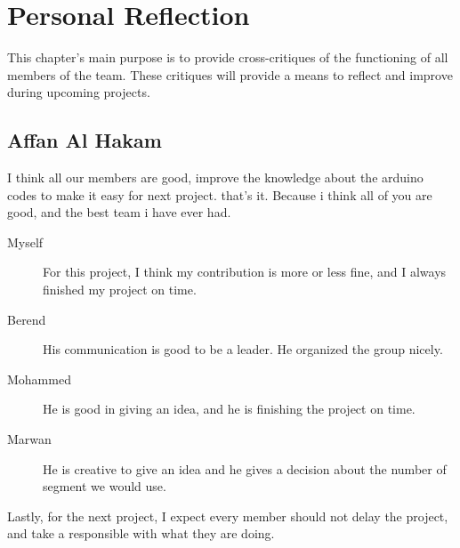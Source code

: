 \chapter{Personal Reflection}
This chapter's main purpose is to provide cross-critiques of the functioning of all members of the team.
These critiques will provide a means to reflect and improve during upcoming projects. 

\section{Affan Al Hakam}
I think all our members are good, improve the knowledge about the arduino codes to make it easy for next project.
that's it.
Because i think all of you are good, and the best team i have ever had.
\begin{description}
\item[Myself]
For this project, I think my contribution is more or less fine, and I always finished my project on time.
\item[Berend]
His communication is good to be a leader.
He organized the group nicely.
\item[Mohammed]
He is good in giving an idea, and he is finishing the project on time.
\item[Marwan]
He is creative to give an idea and he gives a decision about the number of segment we would use.
\end{description}

Lastly, for the next project, I expect every member should not delay the project, and take a responsible with what they are doing.

